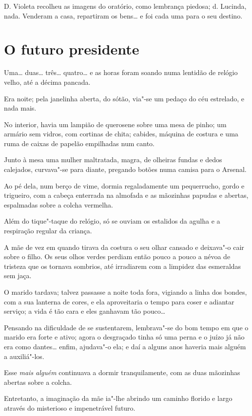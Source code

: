 D. Violeta recolheu as imagens do oratório, como lembrança piedosa; d.
Lucinda, nada. Venderam a casa, repartiram os bens\ldots{} e foi cada uma
para o seu destino.

\chapter{O futuro presidente}

Uma\ldots{} duas\ldots{} três\ldots{} quatro\ldots{} e as horas foram soando numa lentidão
de relógio velho, até a décima pancada.

Era noite; pela janelinha aberta, do sótão, via"-se um pedaço do céu
estrelado, e nada mais.

No interior, havia um lampião de querosene sobre uma mesa de pinho; um
armário sem vidros, com cortinas de chita; cabides, máquina de costura e
uma ruma de caixas de papelão empilhadas num canto.

Junto à mesa uma mulher maltratada, magra, de olheiras fundas e dedos
calejados, curvava"-se para diante, pregando botões numa camisa para o
Arsenal.

Ao pé dela, num berço de vime, dormia regaladamente um pequerrucho,
gordo e trigueiro, com a cabeça enterrada na almofada e as mãozinhas
papudas e abertas, espalmadas sobre a colcha vermelha.

Além do tique"-taque do relógio, só se ouviam os estalidos da agulha e a
respiração regular da criança.

A mãe de vez em quando tirava da costura o seu olhar cansado e deixava"-o
cair sobre o filho. Os seus olhos verdes perdiam então pouco a pouco a
névoa de tristeza que os tornava sombrios, até irradiarem com a limpidez
das esmeraldas sem jaça.

O marido tardava; talvez passasse a noite toda fora, vigiando a linha
dos bondes, com a sua lanterna de cores, e ela aproveitaria o tempo para
coser e adiantar serviço; a vida é tão cara e eles ganhavam tão pouco\ldots{}

Pensando na dificuldade de se sustentarem, lembrava"-se do bom tempo em
que o marido era forte e ativo; agora o desgraçado tinha só uma perna e
o juízo já não era como dantes\ldots{} enfim, ajudava"-o ela; e daí a alguns
anos haveria mais alguém a auxiliá"-los.

Esse \emph{mais alguém} continuava a dormir tranquilamente, com as duas
mãozinhas abertas sobre a colcha.

Entretanto, a imaginação da mãe ia"-lhe abrindo um caminho florido e
largo através do misterioso e impenetrável futuro.

